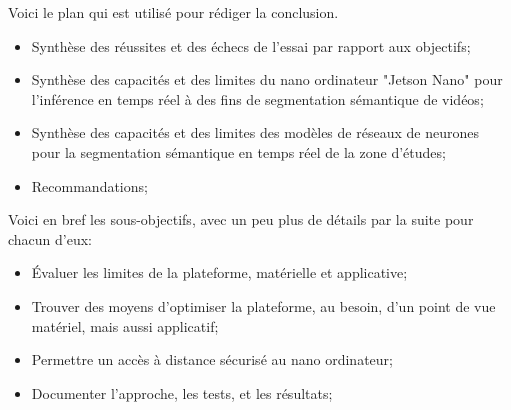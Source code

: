 ﻿{\color{red}
\par Voici le plan qui est utilisé pour rédiger la conclusion.
\begin{itemize}
   \item Synthèse des réussites et des échecs de l'essai par rapport aux objectifs;
   \item Synthèse des capacités et des limites du nano ordinateur "Jetson Nano" pour l'inférence en temps réel à des fins de segmentation sémantique de vidéos;
   \item Synthèse des capacités et des limites des modèles de réseaux de neurones pour la segmentation sémantique en temps réel de la zone d’études;
   \item Recommandations;
\end{itemize}

\par Voici en bref les sous-objectifs, avec un peu plus de détails par la suite pour chacun d'eux: 
\begin{itemize}
   \item Évaluer les limites de la plateforme, matérielle et applicative; 
   \item Trouver des moyens d'optimiser la plateforme, au besoin, d'un point de vue matériel, mais aussi applicatif; 
   \item Permettre un accès à distance sécurisé au nano ordinateur;
   \item Documenter l'approche, les tests, et les résultats;
\end{itemize}
}
